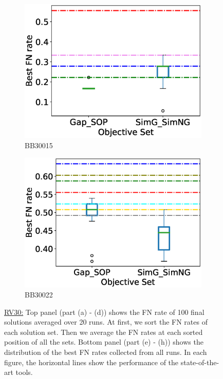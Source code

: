 \begin{figure}[!htbp]
\begin{adjustwidth}{-1cm}{-1cm}
\begin{subfigure}{0.22\textwidth}
			\includegraphics[width=\columnwidth]{Figure/summary/precomputedInit/Balibase/BB30015_objset_fnrate_rank}
			\caption{BB30015}
		\end{subfigure}
		\begin{subfigure}{0.22\textwidth}
			\includegraphics[width=\columnwidth]{Figure/summary/precomputedInit/Balibase/BB30022_objset_fnrate_rank}
			\caption{BB30022}
		\end{subfigure}
		\caption{\underline{RV30:} Top panel (part (a) - (d)) shows the FN rate of 100 final solutions averaged over 20 runs. At first, we sort the FN rates of each solution set. Then we average the FN rates at each sorted position of all the sets. Bottom panel (part (e) - (h)) shows the distribution of the best FN rates collected from all runs. In each figure, the horizontal lines show the performance of the state-of-the-art tools.}
		\label{fig:rv30_fn_rate}
	\end{adjustwidth}
\end{figure}



